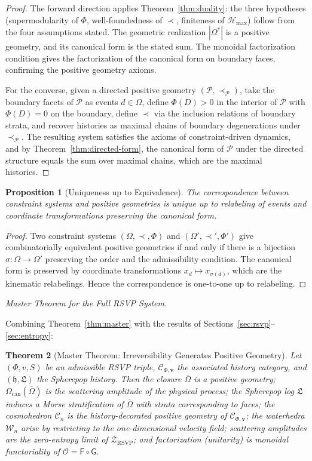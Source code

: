 \documentclass[12pt, oneside]{amsart}
\theoremstyle{plain}
\newtheorem{theorem}{Theorem}[section]
\newtheorem{proposition}[theorem]{Proposition}
\theoremstyle{definition}
\theoremstyle{remark}
\newcommand{\Phif}{\Phi}
\newcommand{\vf}{v}
\newcommand{\Sf}{S}
\newcommand{\OmKS}{\Omega}
\newcommand{\hist}{\mathfrak{h}}
\newcommand{\Log}{\mathfrak{L}}
\newcommand{\Cosmo}{\mathcal{C}_n}
\newcommand{\Water}{\mathcal{W}_n}
\newcommand{\CF}{\Omega_{\mathrm{can}}}
\newcommand{\Ccat}{\mathcal{C}_{\Phi,\mathbf{v}}}
\newcommand{\Gfun}{\mathsf{G}}
\newcommand{\Ffun}{\mathsf{F}}
\newcommand{\Ofun}{\mathcal{O}}
\newcommand{\ZRSVP}{\mathcal{Z}_{\mathrm{RSVP}}}
\newcommand{\Hmax}{\mathcal{H}_{\max}}
\begin{document}
\begin{proof}
The forward direction applies Theorem~\ref{thm:duality}: the three hypotheses (supermodularity of $\Phif$, well-foundedness of $\prec$, finiteness of $\Hmax$) follow from the four assumptions stated. The geometric realization $|\OmKS^*|$ is a positive geometry, and its canonical form is the stated sum. The monoidal factorization condition gives the factorization of the canonical form on boundary faces, confirming the positive geometry axioms.

For the converse, given a directed positive geometry $(\mathcal{P}, \prec_{\mathcal{P}})$, take the boundary facets of $\mathcal{P}$ as events $d \in \OmKS$, define $\Phif(D) > 0$ in the interior of $\mathcal{P}$ with $\Phif(D) = 0$ on the boundary, define $\prec$ via the inclusion relations of boundary strata, and recover histories as maximal chains of boundary degenerations under $\prec_{\mathcal{P}}$. The resulting system satisfies the axioms of constraint-driven dynamics, and by Theorem~\ref{thm:directed-form}, the canonical form of $\mathcal{P}$ under the directed structure equals the sum over maximal chains, which are the maximal histories.
\end{proof}

\begin{proposition}[Uniqueness up to Equivalence]
The correspondence between constraint systems and positive geometries is unique up to relabeling of events and coordinate transformations preserving the canonical form.
\end{proposition}

\begin{proof}
Two constraint systems $(\OmKS, \prec, \Phif)$ and $(\OmKS', \prec', \Phif')$ give combinatorially equivalent positive geometries if and only if there is a bijection $\sigma: \OmKS \to \OmKS'$ preserving the order and the admissibility condition. The canonical form is preserved by coordinate transformations $x_d \mapsto x_{\sigma(d)}$, which are the kinematic relabelings. Hence the correspondence is one-to-one up to relabeling.
\end{proof}

\medskip\noindent\textit{Master Theorem for the Full RSVP System.}

Combining Theorem~\ref{thm:master} with the results of Sections~\ref{sec:rsvp}--\ref{sec:entropy}:

\begin{theorem}[Master Theorem: Irreversibility Generates Positive Geometry]
Let $(\Phif, \vf, \Sf)$ be an admissible RSVP triple, $\Ccat$ the associated history category, and $(\hist, \Log)$ the Spherepop history. Then the closure $\overline{\OmKS}$ is a positive geometry; $\CF(\overline{\OmKS})$ is the scattering amplitude of the physical process; the Spherepop log $\Log$ induces a Morse stratification of $\overline{\OmKS}$ with strata corresponding to faces; the cosmohedron $\Cosmo$ is the history-decorated positive geometry of $\Ccat$; the waterhedra $\Water$ arise by restricting to the one-dimensional velocity field; scattering amplitudes are the zero-entropy limit of $\ZRSVP$; and factorization (unitarity) is monoidal functoriality of $\Ofun = \Ffun \circ \Gfun$.
\end{theorem}
\end{document}
